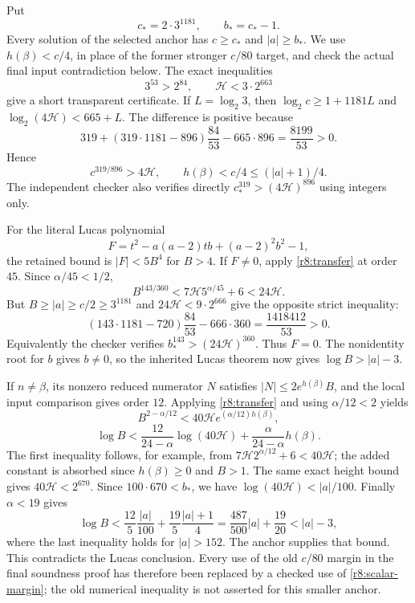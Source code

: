 Put
\[
 c_*=2\cdot3^{1181},\qquad b_*=c_*-1.
\]
Every solution of the selected anchor has $c\ge c_*$ and
$|a|\ge b_*$. We use $h(\beta)<c/4$, in place of the former
stronger $c/80$ target, and check the actual final input contradiction
below. The exact inequalities
\[
 3^{53}>2^{84},\qquad \mathcal H<3\cdot2^{663}
\]
give a short transparent certificate. If $L=\log_2 3$, then
$\log_2c\ge1+1181L$ and
$\log_2(4\mathcal H)<665+L$. The difference is positive because
\[
 319+(319\cdot1181-896)\frac{84}{53}-665\cdot896
   =\frac{8199}{53}>0.
\]
Hence
\begin{equation}\label{r8:scalar-margin}
 c^{319/896}>4\mathcal H,\qquad
 h(\beta)<c/4\le(|a|+1)/4.
\end{equation}
The independent checker also verifies directly
$c_*^{319}>(4\mathcal H)^{896}$ using integers only.

For the literal Lucas polynomial
\[
 F=t^2-a(a-2)tb+(a-2)^2b^2-1,
\]
the retained bound is $|F|<5B^4$ for $B>4$. If $F\ne0$, apply
\eqref{r8:transfer} at order $45$. Since $\alpha/45<1/2$,
\[
 B^{143/360}<7\mathcal H5^{\alpha/45}+6<24\mathcal H.
\]
But $B\ge|a|\ge c/2\ge3^{1181}$ and
$24\mathcal H<9\cdot2^{666}$ give the opposite strict inequality:
\[
 (143\cdot1181-720)\frac{84}{53}-666\cdot360
       =\frac{1418412}{53}>0.
\]
Equivalently the checker verifies
$b_*^{143}>(24\mathcal H)^{360}$. Thus $F=0$.
The nonidentity root for $b$ gives $b\ne0$, so the inherited Lucas
theorem now gives $\log B>|a|-3$.

If $n\ne\beta$, its nonzero reduced numerator $N$ satisfies
$|N|\le2e^{h(\beta)}B$, and the local input comparison gives order
$12$. Applying \eqref{r8:transfer} and using $\alpha/12<2$ yields
\[
 B^{2-\alpha/12}<40\mathcal H e^{(\alpha/12)h(\beta)},
\]
\[
 \log B<\frac{12}{24-\alpha}\log(40\mathcal H)
                 +\frac{\alpha}{24-\alpha}h(\beta).
\]
The first inequality follows, for example, from
$7\mathcal H2^{\alpha/12}+6<40\mathcal H$; the added constant
is absorbed since $h(\beta)\ge0$ and $B>1$.
The same exact height bound gives $40\mathcal H<2^{670}$.
Since $100\cdot670<b_*$, we have
$\log(40\mathcal H)<|a|/100$. Finally $\alpha<19$ gives
\[
 \log B<\frac{12}{5}\frac{|a|}{100}
          +\frac{19}{5}\frac{|a|+1}{4}
       =\frac{487}{500}|a|+\frac{19}{20}<|a|-3,
\]
where the last inequality holds for $|a|>152$. The anchor supplies
that bound. This contradicts the Lucas conclusion. Every use of the
old $c/80$ margin in the final soundness proof has therefore been
replaced by a checked use of \eqref{r8:scalar-margin}; the old numerical
inequality is not asserted for this smaller anchor.

